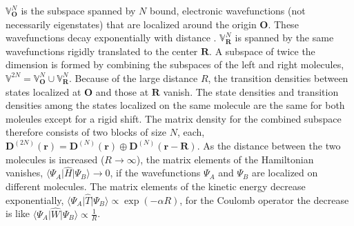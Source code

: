 \documentclass[journal=jpclcd,manuscript=letter]{achemso}
\DeclareMathOperator{\Span}{span}
\newcommand\m[1]{\mathbf{#1}}
\renewcommand\vec[1]{\mathbf{#1}}
\begin{document}
$\mathbb{V}_{\vec{O}}^N$ is the subspace spanned by $N$ bound, electronic wavefunctions (not necessarily eigenstates) that are localized around the origin $\vec{O}$.
These wavefunctions decay exponentially with distance \cite{Katriel1980asymptotic}.
$\mathbb{V}_{\vec{R}}^N$ is spanned by the same wavefunctions rigidly translated to the center $\vec{R}$.
A subspace of twice the dimension is formed by combining the subspaces of the left and right molecules,
$\mathbb{V}^{2N} = \mathbb{V}^{N}_{\vec{O}} \cup \mathbb{V}^{N}_{\vec{R}}$.
Because of the large distance $R$, the transition densities between states localized at $\vec{O}$ and those at $\vec{R}$ vanish.
The state densities and transition densities among the states localized on the same molecule are the same
for both moleules except for a rigid shift. The matrix density for the combined subspace therefore consists of two blocks of size $N$, each,
$\m{D}^{(2N)}(\vec{r}) = \m{D}^{(N)}(\vec{r}) \oplus \m{D}^{(N)}(\vec{r}-\vec{R})$.
As the distance between the two molecules is increased ($R \to \infty$), the matrix elements of the Hamiltonian vanishes, $\langle \Psi_{A} \vert \hat{H} \vert \Psi_{B} \rangle \to 0$, if the wavefunctions $\Psi_A$ and $\Psi_B$ are localized on different molecules. The matrix elements of the kinetic energy decrease exponentially, $\langle \Psi_{A} \vert \hat{T} \vert \Psi_{B} \rangle \propto \exp(-\alpha R)$, for the Coulomb operator the decrease is like $\langle \Psi_{A} \vert \hat{W} \vert \Psi_{B} \rangle \propto \frac{1}{R}$.
\end{document}
